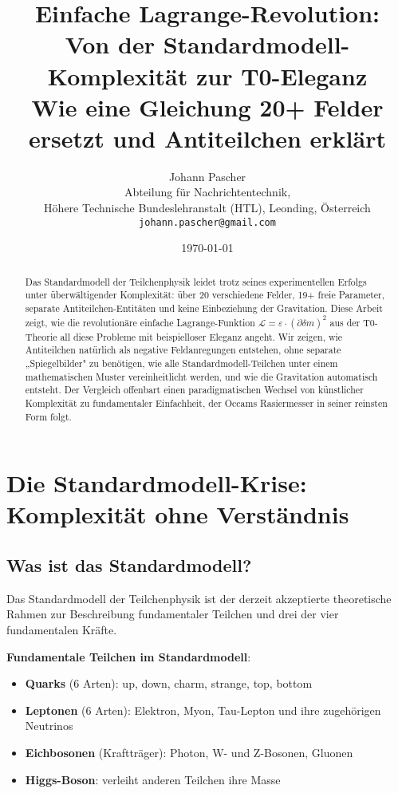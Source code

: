 \documentclass[12pt,a4paper]{article}
\title{Einfache Lagrange-Revolution: \\
	Von der Standardmodell-Komplexität zur T0-Eleganz \\
	\large Wie eine Gleichung 20+ Felder ersetzt und Antiteilchen erklärt}
\author{Johann Pascher\\
	Abteilung für Nachrichtentechnik, \\Höhere Technische Bundeslehranstalt (HTL), Leonding, Österreich\\
	\texttt{johann.pascher@gmail.com}}
\date{\today}
\newcommand{\Lag}{\mathcal{L}}
\newcommand{\deltam}{\delta m}
\theoremstyle{definition}
\theoremstyle{remark}
\begin{document}
	
	\maketitle
	
	\begin{abstract}
		Das Standardmodell der Teilchenphysik leidet trotz seines experimentellen Erfolgs unter überwältigender Komplexität: über 20 verschiedene Felder, 19+ freie Parameter, separate Antiteilchen-Entitäten und keine Einbeziehung der Gravitation. Diese Arbeit zeigt, wie die revolutionäre einfache Lagrange-Funktion $\Lag = \varepsilon \cdot (\partial \deltam)^2$ aus der T0-Theorie all diese Probleme mit beispielloser Eleganz angeht. Wir zeigen, wie Antiteilchen natürlich als negative Feldanregungen entstehen, ohne separate „Spiegelbilder" zu benötigen, wie alle Standardmodell-Teilchen unter einem mathematischen Muster vereinheitlicht werden, und wie die Gravitation automatisch entsteht. Der Vergleich offenbart einen paradigmatischen Wechsel von künstlicher Komplexität zu fundamentaler Einfachheit, der Occams Rasiermesser in seiner reinsten Form folgt.
	\end{abstract}
	
	\tableofcontents
	\newpage
	
	\section{Die Standardmodell-Krise: Komplexität ohne Verständnis}
	
	\subsection{Was ist das Standardmodell?}
	
	Das Standardmodell der Teilchenphysik ist der derzeit akzeptierte theoretische Rahmen zur Beschreibung fundamentaler Teilchen und drei der vier fundamentalen Kräfte.
	
	\textbf{Fundamentale Teilchen im Standardmodell}:
	\begin{itemize}
		\item \textbf{Quarks} (6 Arten): up, down, charm, strange, top, bottom
		\item \textbf{Leptonen} (6 Arten): Elektron, Myon, Tau-Lepton und ihre zugehörigen Neutrinos
		\item \textbf{Eichbosonen} (Kraftträger): Photon, W- und Z-Bosonen, Gluonen
		\item \textbf{Higgs-Boson}: verleiht anderen Teilchen ihre Masse
	\end{itemize}
	
\end{document}
